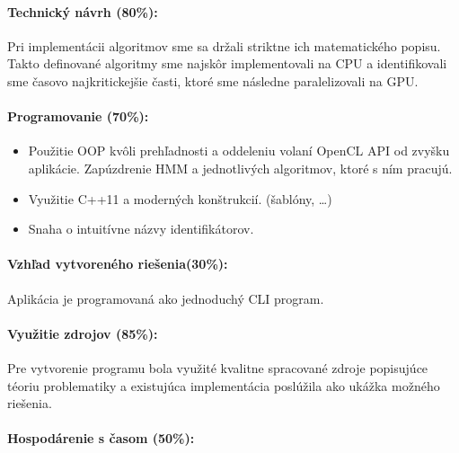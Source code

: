 \documentclass[11pt,a4paper]{article}
\begin{document}
\paragraph{Technický návrh (80\%):}
Pri implementácii algoritmov sme sa držali striktne ich matematického popisu. Takto definované algoritmy sme najskôr implementovali na CPU a identifikovali sme časovo najkritickejšie časti, ktoré sme následne paralelizovali na GPU.

\paragraph{Programovanie (70\%):}

\begin{itemize}
  \item Použitie OOP kvôli prehľadnosti a oddeleniu volaní OpenCL API od zvyšku aplikácie. Zapúzdrenie HMM a jednotlivých algoritmov, ktoré s ním pracujú.
  \item Využitie C++11 a moderných konštrukcií. (šablóny, \dots)
  \item Snaha o intuitívne názvy identifikátorov.
\end{itemize}

\paragraph{Vzhľad vytvoreného riešenia(30\%):}

Aplikácia je programovaná ako jednoduchý CLI program.

\paragraph{Využitie zdrojov (85\%):}

Pre vytvorenie programu bola využité kvalitne spracované zdroje popisujúce téoriu problematiky a existujúca implementácia poslúžila ako ukážka možného riešenia.

\paragraph{Hospodárenie s časom (50\%):}
\end{document}
